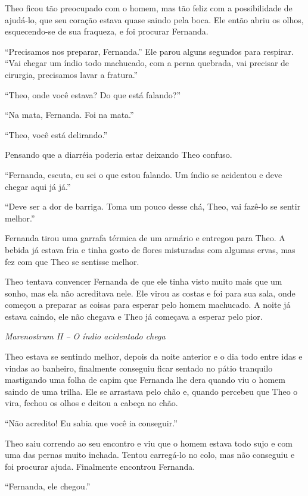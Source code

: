 Theo ficou tão preocupado com o homem, mas tão feliz com a possibilidade
de ajudá-lo, que seu coração estava quase saindo pela boca. Ele então
abriu os olhos, esquecendo-se de sua fraqueza, e foi procurar Fernanda.

``Precisamos nos preparar, Fernanda.'' Ele parou alguns segundos para
respirar. ``Vai chegar um índio todo machucado, com a perna quebrada,
vai precisar de cirurgia, precisamos lavar a fratura.''

``Theo, onde você estava? Do que está falando?''

``Na mata, Fernanda. Foi na mata.''

``Theo, você está delirando.''

Pensando que a diarréia poderia estar deixando Theo confuso.

``Fernanda, escuta, eu sei o que estou falando. Um índio se acidentou e
deve chegar aqui já já.''

``Deve ser a dor de barriga. Toma um pouco desse chá, Theo, vai fazê-lo
se sentir melhor.''

Fernanda tirou uma garrafa térmica de um armário e entregou para Theo. A
bebida já estava fria e tinha gosto de flores misturadas com algumas
ervas, mas fez com que Theo se sentisse melhor.

Theo tentava convencer Fernanda de que ele tinha visto muito mais que um
sonho, mas ela não acreditava nele. Ele virou as costas e foi para sua
sala, onde começou a preparar as coisas para esperar pelo homem
machucado. A noite já estava caindo, ele não chegava e Theo já começava
a esperar pelo pior.

\asterisc

\emph{Marenostrum II -- O índio acidentado chega}

Theo estava se sentindo melhor, depois da noite anterior e o dia todo
entre idas e vindas ao banheiro, finalmente conseguiu ficar sentado no
pátio tranquilo mastigando uma folha de capim que Fernanda lhe dera
quando viu o homem saindo de uma trilha. Ele se arrastava pelo chão e,
quando percebeu que Theo o vira, fechou os olhos e deitou a cabeça no
chão.

``Não acredito! Eu sabia que você ia conseguir.''

Theo saiu correndo ao seu encontro e viu que o homem estava todo sujo e
com uma das pernas muito inchada. Tentou carregá-lo no colo, mas não
conseguiu e foi procurar ajuda. Finalmente encontrou Fernanda.

``Fernanda, ele chegou.''

